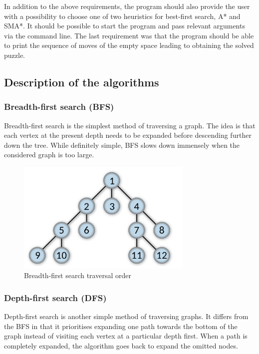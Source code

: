 \documentclass[12pt]{article}
\begin{document}
In addition to the above requirements, the program should also provide the user with a possibility to choose one of two heuristics for best-first search, A* and SMA*. It should be possible to start the program and pass relevant arguments via the command line. The last requirement was that the program should be able to print the sequence of moves of the empty space leading to obtaining the solved puzzle.

\subsection{Description of the algorithms}

\subsubsection{Breadth-first search (BFS)}

Breadth-first search is the simplest method of traversing a graph. The idea is that each vertex at the present depth needs to be expanded before descending further down the tree. While definitely simple, BFS slows down immensely when the considered graph is too large.

\begin{figure}[h]
    \includegraphics[width=0.75\textwidth]{bfs}
    \centering
    \caption{Breadth-first search traversal order \cite{bfs_image}}
\end{figure}

\subsubsection{Depth-first search (DFS)}

Depth-first search is another simple method of traversing graphs. It differs from the BFS in that it prioritises expanding one path towards the bottom of the graph instead of visiting each vertex at a particular depth first. When a path is completely expanded, the algorithm goes back to expand the omitted nodes.
\end{document}
